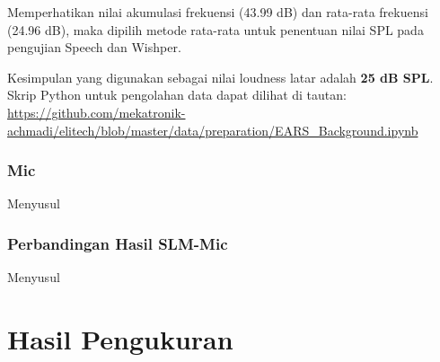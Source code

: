 \documentclass[12pt,]{article}
\begin{document}
	Memperhatikan nilai akumulasi frekuensi (43.99 dB) dan rata-rata frekuensi (24.96 dB),
	maka dipilih metode rata-rata untuk penentuan nilai SPL pada pengujian Speech dan Wishper.
	
	Kesimpulan yang digunakan sebagai nilai loudness latar adalah \textbf{25 dB SPL}.
	Skrip Python untuk pengolahan data dapat dilihat di tautan:\\
	\url{https://github.com/mekatronik-achmadi/elitech/blob/master/data/preparation/EARS_Background.ipynb}
	
	\subsubsection{Mic}
	
	Menyusul
	
	\subsubsection{Perbandingan Hasil SLM-Mic}
	
	Menyusul
	
	
	\newpage
	\section{Hasil Pengukuran}
	
	
\end{document}
